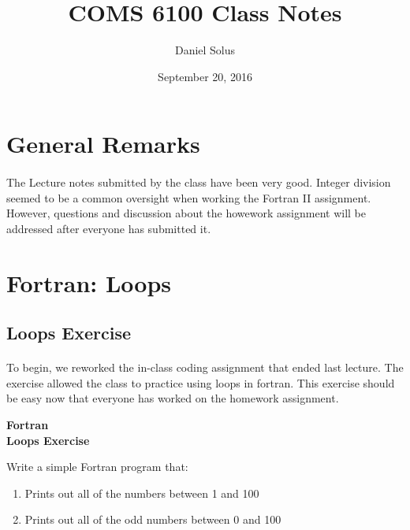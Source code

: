 \documentclass[11pt]{article}
\title{COMS 6100 Class Notes}
\author{Daniel Solus}
\date{September 20, 2016}
\begin{document}
\maketitle

\section{General Remarks}
\paragraph{} The Lecture notes submitted by the class have been very good. Integer division seemed to be a common oversight when working the Fortran II assignment. However, questions and discussion about the howework assignment will be addressed after everyone has submitted it.

\section{Fortran: Loops}
\subsection{Loops Exercise}

\paragraph{} To begin, we reworked the in-class coding assignment that ended last lecture. The exercise allowed the class to practice using loops in fortran. This exercise should be easy now that everyone has worked on the homework assignment.

\begin{flushleft}
\bf Fortran\\
\bf Loops Exercise
\end{flushleft}

  Write a simple Fortran program that:
  \begin{enumerate}
    \item Prints out all of the numbers between 1 and 100
    \item Prints out all of the odd numbers between 0 and 100
  \end{enumerate}
  \vfill
\end{document}
